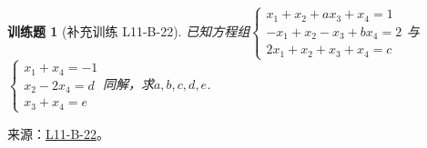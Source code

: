 \documentclass[UTF8,12pt,a4paper,fontset=fandol]{ctexart}
\newtheorem{exercise}{训练题}[section]
\begin{document}
\begin{exercise}[补充训练 L11-B-22]\label{prob:L11-B-22}
已知方程组$\begin{cases}
                x_1+x_2+ax_3+x_4=1 \\ -x_1+x_2-x_3+bx_4=2 \\ 2x_1+x_2+x_3+x_4=c
            \end{cases}$与$\begin{cases}
                x_1+x_4=-1 \\ x_2-2x_4=d \\ x_3+x_4=e
            \end{cases}$同解，求$a,b,c,d,e$.
\end{exercise}
\noindent 来源：\href{https://github.com/yhwu-is/Linear-Algebra-Left-Undone/blob/new/%E8%AE%B2%E4%B9%89/%E4%B8%93%E9%A2%98/11%20%E6%9C%9D%E8%8A%B1%E5%A4%95%E6%8B%BE.tex}{L11-B-22}。
\end{document}

